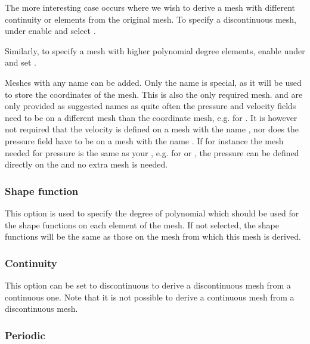The more interesting case occurs where we wish to derive a mesh with
different continuity or elements from the original mesh. To specify a
discontinuous mesh, under  enable
 and select .

Similarly, to specify a mesh with higher polynomial degree elements, enable
 under  and set
.

Meshes with any name can be added. Only the name  
is special, as it will be used to store the coordinates of the mesh. This 
is also the only required mesh.  and 
are only provided as suggested names as quite often the pressure 
and velocity fields need to be on a different mesh 
than the coordinate mesh, e.g. for \PoDGPt. It is however 
not required that the velocity is defined on a mesh with the name
, nor does the pressure field have to be on a mesh
with the name . If for instance the mesh needed 
for pressure is the same as your , e.g. 
for \Poo or \Pzero\Pone, the pressure can be defined directly on
the  and no extra mesh is needed.

\subsubsection{Shape function}

This option is used to specify the degree of polynomial which should be used
for the shape functions on each element of the mesh. If not selected, the
shape functions will be the same as those on the mesh from which this mesh
is derived.

\subsubsection{Continuity}

This option can be set to discontinuous to derive a discontinuous mesh from
a continuous one. Note that it is not possible to derive a continuous mesh
from a discontinuous mesh.

\subsubsection{Periodic}\label{Sect:periodic}

